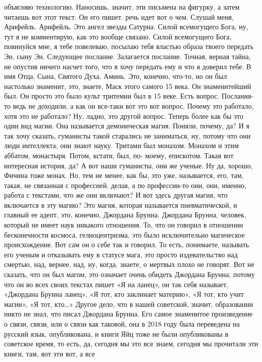 объясняю технологию. Наносишь, значит, эти письмена на фигурку, а затем читаешь
вот этот текст. Он его пишет. речь идет вот о чем. Слушай меня, Арифейль.
Арифейль. Это ангел звезды Сатурна. Силой всемогущего Бога, ну, тут я не
комментирую, как это вообще связано. Силой всемогущего Бога, повинуйся мне, я
тебе повелеваю, посылаю тебя властью образа твоего передать Эн, сыну Эн.
Следующее послание. Залагается послание. Точная, верная тайна, не опустив ничего
насчет того, что я хочу передать ему и что я доверил тебе. В имя Отца, Сына,
Святого Духа. Аминь. Это, конечно, что-то, но он был настолько знаменит, это,
знаете, Маск этого самого 15 века. Он знаменитейший был. Он просто это было
культ тритемии был в 15 веке. Есть вопрос. Послания-то ведь не доходили, а как
он все-таки вот это вот вопрос. Почему это работало, хотя это не работало? Ну,
ладно, это другой вопрос. Теперь более как бы это один вид магии. Она называется
демоническая магия. Поняли, почему, да? И я так хочу сказать, гуманисты такой
старались не заниматься, ну, потому что они люди интеллекта, они знают науку.
Тритами был монахом. Монахом и этим аббатом, монастыря. Потом, кстати, был, по-
моему, епискотом. Такая вот интересная история, да? А вот наши гуманисты, они же
ученые. Ну да, хорошо, Фичина тоже монах. Но, тем не менее, как бы, это уже,
называется, его, там, такая, не связанная с профессией. делая, а по профессии-то
они, они, именно, работа с текстами, что же они включают? И вот здесь другая
магия, что включается в эту магию? Это магия, которая называется пневматической,
и главный ее адепт, это, конечно, Джордана Брунна. Джордана Брунна, человек,
который не имеет наук никакого отношения. То, что он говорил в отношении
бесконечности космоса, гелиоцентризма, это было исключительно магическое
происхождение. Вот сам он о себе так и говорил. То есть, понимаете, называть его
ученым и отказывать ему в статусе мага, это просто издевательство над смертью,
над, вернее, над, ну, когда, знаете, о мертвых плохо не говорят. Вот не сказать,
что он был магом, это означает очень обидеть Джордана Брунна, потому что он во
всех своих текстах пишет «Я на ланец», он так себя называет, «Джордана Брунна
ланец», «Я тот, кто заклинает материю», «Я тот, кто учит магии», «Я тот, кто…»
Другое дело, что в нашей советской, значит, образовании никто не знал, что писал
Джордана Брунна. Его самое знаменитое произведение о связи, связи, или о связи
как таковой, она в 2018 году была переведена на русский язык, опубликована, и
книги Яйц тоже не были опубликованы в советское время, то есть, да, сегодня мы
это все знаем, сегодня мы прочитали эти книги, там, вот эти вот, а все

